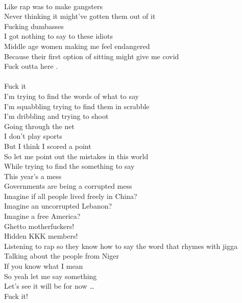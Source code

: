 \documentclass[12pt, b5paper, oneside]{book}
\begin{document}
\\Like rap was to make gangsters
\\Never thinking it might've gotten them out of it
\\Fucking dumbasses
\\I got nothing to say to these idiots
\\Middle age women making me feel endangered
\\Because their first option of sitting might give me covid
\\Fuck outta here .
%
\\\\Fuck it
\\I'm trying to find the words of what to say
\\I'm squabbling trying to find them in scrabble
\\I'm dribbling and trying to shoot
\\Going through the net
\\I don't play sports
\\But I think I scored a point
\\So let me point out the mistakes in this world
\\While trying to find the something to say
\\This year's a mess
\\Governments are being a corrupted mess
\\Imagine if all people lived freely in China?
\\Imagine an uncorrupted Lebanon?
\\Imagine a free America?
\\Ghetto motherfuckers!
\\Hidden KKK members!
\\Listening to rap so they know how to say the word that rhymes with jigga
\\Talking about the people from Niger
\\If you know what I mean
\\So yeah let me say something
\\Let's see it will be for now \dots 
\\Fuck it!
\newpage
\end{document}
